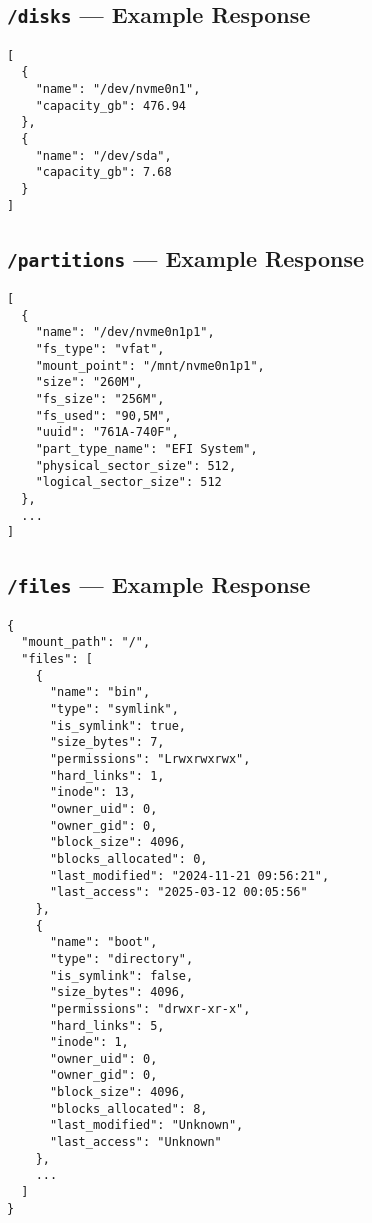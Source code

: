 \documentclass[12pt,a4paper]{article}
\begin{document}
\subsection*{\texttt{/disks} — Example Response}
\begin{verbatim}
[
  {
    "name": "/dev/nvme0n1",
    "capacity_gb": 476.94
  },
  {
    "name": "/dev/sda",
    "capacity_gb": 7.68
  }
]
\end{verbatim}

\subsection*{\texttt{/partitions} — Example Response}
\begin{verbatim}
[
  {
    "name": "/dev/nvme0n1p1",
    "fs_type": "vfat",
    "mount_point": "/mnt/nvme0n1p1",
    "size": "260M",
    "fs_size": "256M",
    "fs_used": "90,5M",
    "uuid": "761A-740F",
    "part_type_name": "EFI System",
    "physical_sector_size": 512,
    "logical_sector_size": 512
  },
  ...
]
\end{verbatim}

\newpage

\subsection*{\texttt{/files} — Example Response}
\begin{verbatim}
{
  "mount_path": "/",
  "files": [
    {
      "name": "bin",
      "type": "symlink",
      "is_symlink": true,
      "size_bytes": 7,
      "permissions": "Lrwxrwxrwx",
      "hard_links": 1,
      "inode": 13,
      "owner_uid": 0,
      "owner_gid": 0,
      "block_size": 4096,
      "blocks_allocated": 0,
      "last_modified": "2024-11-21 09:56:21",
      "last_access": "2025-03-12 00:05:56"
    },
    {
      "name": "boot",
      "type": "directory",
      "is_symlink": false,
      "size_bytes": 4096,
      "permissions": "drwxr-xr-x",
      "hard_links": 5,
      "inode": 1,
      "owner_uid": 0,
      "owner_gid": 0,
      "block_size": 4096,
      "blocks_allocated": 8,
      "last_modified": "Unknown",
      "last_access": "Unknown"
    },
    ...
  ]
}
\end{verbatim}
\end{document}
